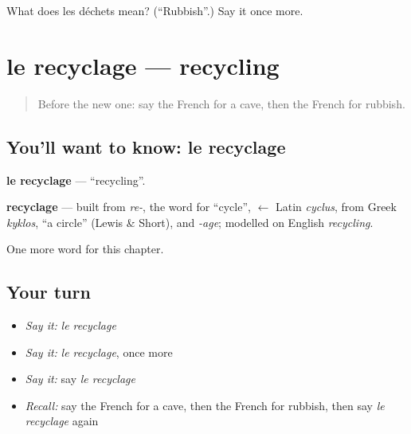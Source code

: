 \begin{tcolorbox}[breakable,colback=teal!4,colframe=teal!35!black,title={Before you move on}]
What does les déchets mean? (\textquotedblleft{}Rubbish\textquotedblright{}.) Say it once more.
\end{tcolorbox}
\section[le recyclage]{le recyclage — recycling}

\label{lesson:FR-C255-recyclage}



\begin{quote}
Before the new one: say the French for a cave, then the French for rubbish.
\end{quote}

\subsection*{You'll want to know: le recyclage}
\textbf{le recyclage} — \textquotedblleft{}recycling\textquotedblright{}.

\begin{cousinweb}
\textbf{recyclage} — built from \emph{re-}, the word for \textquotedblleft{}cycle\textquotedblright{}, $\leftarrow$ Latin \emph{cyclus}, from Greek \emph{kyklos}, \textquotedblleft{}a circle\textquotedblright{} (Lewis \& Short), and \emph{-age}; modelled on English \emph{recycling}.
\end{cousinweb}

\begin{grammarlens}[title={What you've built}]
One more word for this chapter.
\end{grammarlens}

\subsection*{Your turn}
\begin{itemize}
\raggedright
  \item \emph{Say it:} \emph{le recyclage}
  \item \emph{Say it:} \emph{le recyclage}, once more
  \item \emph{Say it:} say \emph{le recyclage}
  \item \emph{Recall:} say the French for a cave, then the French for rubbish, then say \emph{le recyclage} again
\end{itemize}

